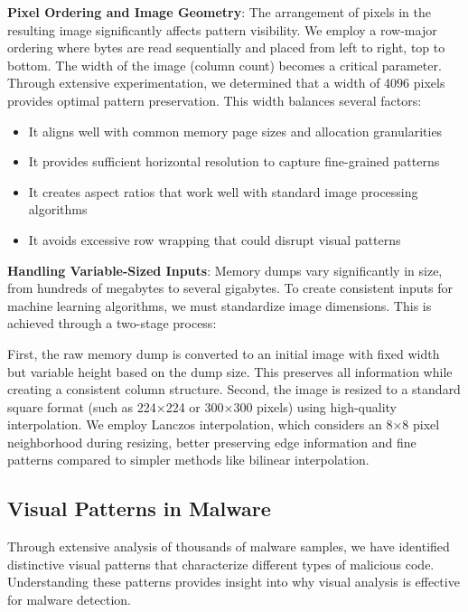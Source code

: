 \textbf{Pixel Ordering and Image Geometry}: The arrangement of pixels in the resulting image significantly affects pattern visibility. We employ a row-major ordering where bytes are read sequentially and placed from left to right, top to bottom. The width of the image (column count) becomes a critical parameter. Through extensive experimentation, we determined that a width of 4096 pixels provides optimal pattern preservation. This width balances several factors:

\begin{itemize}
    \item It aligns well with common memory page sizes and allocation granularities
    \item It provides sufficient horizontal resolution to capture fine-grained patterns
    \item It creates aspect ratios that work well with standard image processing algorithms
    \item It avoids excessive row wrapping that could disrupt visual patterns
\end{itemize}

\textbf{Handling Variable-Sized Inputs}: Memory dumps vary significantly in size, from hundreds of megabytes to several gigabytes. To create consistent inputs for machine learning algorithms, we must standardize image dimensions. This is achieved through a two-stage process:

First, the raw memory dump is converted to an initial image with fixed width but variable height based on the dump size. This preserves all information while creating a consistent column structure. Second, the image is resized to a standard square format (such as 224×224 or 300×300 pixels) using high-quality interpolation. We employ Lanczos interpolation, which considers an 8×8 pixel neighborhood during resizing, better preserving edge information and fine patterns compared to simpler methods like bilinear interpolation.

\subsection{Visual Patterns in Malware}
\label{subsec:malware_patterns}

Through extensive analysis of thousands of malware samples, we have identified distinctive visual patterns that characterize different types of malicious code. Understanding these patterns provides insight into why visual analysis is effective for malware detection.

